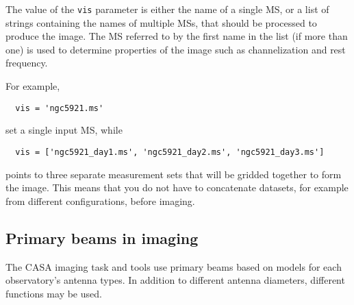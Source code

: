 The value of the {\tt vis} parameter is either the name of a single
MS, or a list of strings containing the names of multiple MSs, that
should be processed to produce the image.  The MS referred to by the
first name in the list (if more than one) is used to determine
properties of the image such as channelization and rest frequency.

For example,
\small
\begin{verbatim}
  vis = 'ngc5921.ms'
\end{verbatim}
\normalsize
set a single input MS, while
\small
\begin{verbatim}
  vis = ['ngc5921_day1.ms', 'ngc5921_day2.ms', 'ngc5921_day3.ms']
\end{verbatim}
\normalsize
points to three separate measurement sets that will be gridded
together to form the image.  This means that you do not have
to concatenate datasets, for example from different configurations,
before imaging.

\subsection{Primary beams in imaging }
\label{section:im.pars.pb}

The CASA imaging task and tools use primary beams based on models
for each observatory's antenna types.  In addition to different 
antenna diameters, different functions may be used.  

